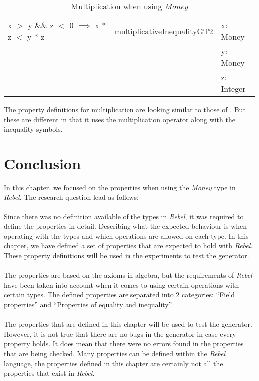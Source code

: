 \begin{table}[!ht]
\begin{tabular}{lll}
\rowcolor[HTML]{EFEFEF} x $>$ y \&\& z $<$ 0 $\implies$ x * z $<$ y * z & multiplicativeInequalityGT2 & x: Money                 \\
\rowcolor[HTML]{EFEFEF}                                                 &                             & y: Money                 \\
\rowcolor[HTML]{EFEFEF}                                                 &                             & z: Integer               \\ \hline
\end{tabular}
\caption{Multiplication when using \textit{Money}}
\label{tbl:properties_money_multiplication_updated}
\end{table}
\FloatBarrier
The property definitions for multiplication are looking similar to those of
. But these are different in that it
uses the multiplication operator along with the inequality symbols.

\section{Conclusion}
In this chapter, we focused on the properties when using the \textit{Money}
type in \textit{Rebel}. The research question lead as follows:\rqOne\\
\\
Since there was no definition available of the types in \textit{Rebel}, it was
required to define the properties in detail. Describing what the expected
behaviour is when operating with the types and which operations are allowed on
each type. In this chapter, we have defined a set of properties that are
expected to hold with \textit{Rebel}. These property definitions will be used in the experiments to test the generator.\\
\\
The properties are based on the axioms in algebra, but the requirements of
\textit{Rebel} have been taken into account when it comes to using certain
operations with certain types. The defined properties are separated into 2
categories: ``Field properties'' and ``Properties of equality and inequality''.
\\
\\
The properties that are defined in this chapter will be used to test the
generator. However, it is not true that there are no bugs in the generator in
case every property holds. It does mean that there were no errors found in the
properties that are being checked. Many properties can be defined within the
\textit{Rebel} language, the properties defined in this chapter are certainly
not all the properties that exist in \textit{Rebel}.

